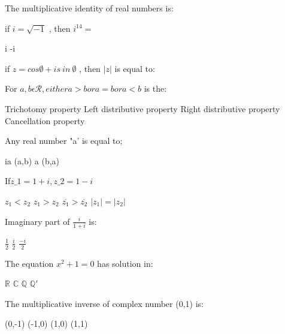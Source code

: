\documentclass{exam}
\begin{document}
\begin{questions}
The multiplicative identity of real numbers is:\\
\begin{oneparchoices}
\end{oneparchoices}
\question 

if \(i =\sqrt{-1}\) , then \(i^{14}=\)\\
\begin{oneparchoices}
\choice i
\choice -i
\end{oneparchoices}
\question 

if \(z = cos\emptyset + is\ in\ \emptyset\) , then \(\left| z \right| \) is equal to:\\
\begin{oneparchoices}
\end{oneparchoices}
\question 

For \( a,b \epsilon\mathscr{R} , either a>b or a=b or a<b \) is the:\\
\begin{oneparchoices}
\choice Trichotomy property
\choice Left distributive property
\choice Right distributive property
\choice Cancellation property
\end{oneparchoices}
\question 

Any real number "a' is equal to;\\
\begin{oneparchoices}
\choice ia
\choice (a,b)
\choice a
\choice (b,a)
\end{oneparchoices}
\question 

If\( z\_{1} =1+i ,z \_{2} = 1-i\)\\
\begin{oneparchoices}
\choice \(z_{1} < z_{2}\)
\choice \(z_{1} > z_{2}\)
\choice \(\overline{z_{1}} > \overline{z_{2}}\)
\choice \(\left| z_{1} \right|=\left|z_{2}\right|\)
\end{oneparchoices}
\question 

Imaginary part of \(\frac{i}{1+i}\) is:\\
\begin{oneparchoices}
\choice \(\frac{1}{2}\)
\choice \(\frac{i}{2}\)
\choice \(\frac{-i}{2}\)
\end{oneparchoices}
\question 

The equation \( x^{2} +1 =0 \) has solution in:\\
\begin{oneparchoices}
\choice \(\mathbb{R}\)
\choice \(\mathbb{C}\)
\choice \(\mathbb{Q}\)
\choice \(\mathbb{Q'}\)
\end{oneparchoices}
\question 

The multiplicative inverse of complex number (0,1) is:\\
\begin{oneparchoices}
\choice (0,-1)
\choice (-1,0)
\choice (1,0)
\choice (1,1)
\end{oneparchoices}

\end{questions}
\end{document}
